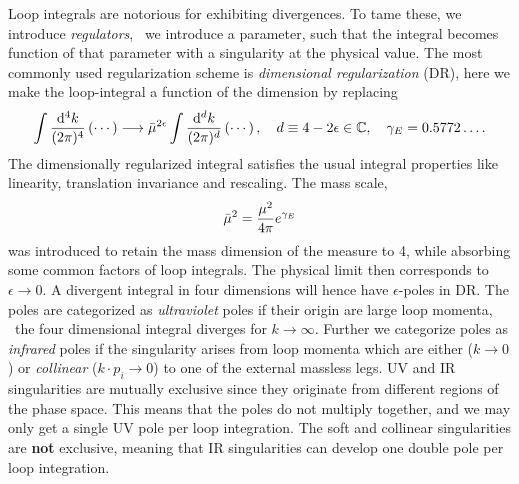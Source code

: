 Loop integrals are notorious for exhibiting divergences. To tame these, we introduce \textit{regulators}, \ie\ we introduce a parameter, such that the integral becomes function of that parameter with a singularity at the physical value. The most commonly used regularization scheme is \textit{dimensional regularization} (\acs{DR}), here we make the loop-integral a function of the dimension by replacing
\begin{equation}
\int \frac{\mathrm{d}^4 k}{(2 \pi)^4} \left( \cdots \right) \longrightarrow \bar{\mu}^{2 \epsilon} \int \frac{\mathrm{d}^d k}{(2 \pi)^d} \left( \cdots \right), \quad d \equiv 4 - 2 \epsilon \in \mathbb{C}, \quad \gamma_E =  0.5772\ldots.
\end{equation}
The dimensionally regularized integral satisfies the usual integral properties like linearity, translation invariance and rescaling. The mass scale,
\begin{equation}
\bar{\mu}^2 = \frac{\mu^2}{4 \pi} e^{\gamma_E}
\end{equation}
was introduced to retain the mass dimension of the measure to 4, while absorbing some common factors of loop integrals. The physical limit then corresponds to $\epsilon \rightarrow 0$. A divergent integral in four dimensions will hence have $\epsilon$-poles in \acs{DR}. The poles are categorized as \textit{ultraviolet} poles if their origin are large loop momenta, \ie\ the four dimensional integral diverges for $k \rightarrow \infty$. Further we categorize poles as \textit{infrared} poles if the singularity arises from loop momenta which are either  ($k \rightarrow 0$) or \textit{collinear} ($k \cdot p_i \rightarrow 0$) to one of the external massless legs. \acs{UV} and \acs{IR} singularities are mutually exclusive since they originate from different regions of the phase space. This means that the poles do not multiply together, and we may only get a single \acs{UV} pole per loop integration. The soft and collinear singularities are \textbf{not} exclusive, meaning that \acs{IR} singularities can develop one double pole per loop integration.

